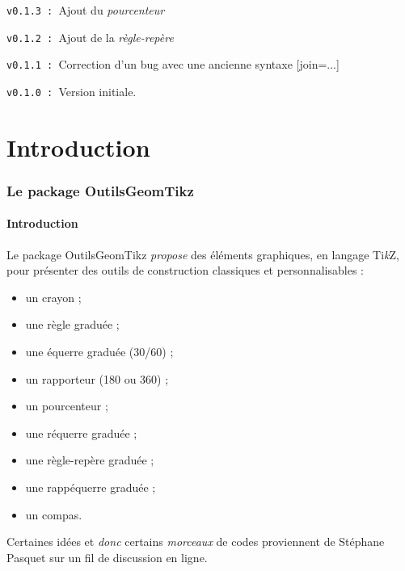 \documentclass[french,a4paper,11pt]{article}
\providecommand\tikzlogo{Ti\textit{k}Z}
\let\TikZ\tikzlogo
\begin{document}
\verb|v0.1.3 : |Ajout du \textit{pourcenteur}

\verb|v0.1.2 : |Ajout de la \textit{règle-repère}

\verb|v0.1.1 : |Correction d'un bug avec une ancienne syntaxe \textsf{[join=...]}

\verb|v0.1.0 : |Version initiale.

\vspace{1cm}

\newpage

\part{Introduction}

\section{Le package OutilsGeomTikz}

\subsection{Introduction}

\begin{noteblock}
Le package \textsf{OutilsGeomTikz} \textit{propose} des éléments graphiques, en langage \TikZ, pour présenter des outils de construction classiques et personnalisables :

\begin{itemize}
	\item un crayon ;
	\item une règle graduée ;
	\item une équerre graduée (30/60) ;
	\item un rapporteur (180 ou 360) ;
	\item un pourcenteur ;
	\item une réquerre graduée ;
	\item une \og règle-repère \fg{} graduée ;
	\item une \og rappéquerre \fg{} graduée ;
	\item un compas.
\end{itemize}
\vspace*{-\baselineskip}\leavevmode
\end{noteblock}

\begin{cautionblock}
Certaines idées et \textit{donc} certains \textit{morceaux} de codes proviennent de Stéphane Pasquet\footnotemark{} sur un fil de discussion en ligne.
\end{cautionblock}
\end{document}
